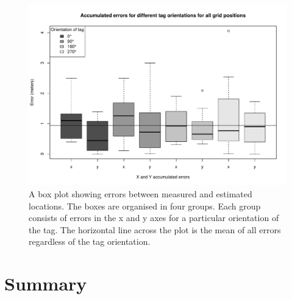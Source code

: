 \begin{figure}
	\begin{center}
		\includegraphics[width=1\textwidth]{figures/error_boxplot}
		\caption{A box plot showing errors between measured and estimated locations. The boxes are organised in four groups. Each group consists of errors in the x and y axes for a particular orientation of the tag. The horizontal line across the plot is the mean of all errors regardless of the tag orientation.}
	\end{center}
\end{figure}

\section{Summary}
